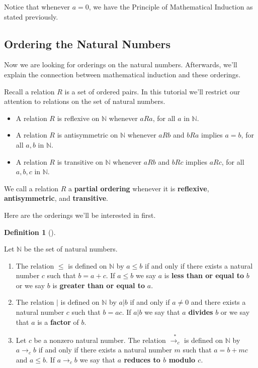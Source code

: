 \documentclass[
  twoside,
  12pt,
  letterpaper]{article}
\providecommand{\tightlist}{%
  \setlength{\itemsep}{0pt}\setlength{\parskip}{0pt}}\usepackage{longtable,booktabs,array}
\theoremstyle{definition}
\theoremstyle{definition}
\newtheorem{definition}{Definition}[section]
\theoremstyle{plain}
\theoremstyle{definition}
\theoremstyle{plain}
\theoremstyle{remark}
\begin{document}
Notice that whenever \(a=0\), we have the Principle of Mathematical
Induction as stated previously.

\hypertarget{ordering-the-natural-numbers}{%
\subsection{Ordering the Natural
Numbers}\label{ordering-the-natural-numbers}}

Now we are looking for orderings on the natural numbers. Afterwards,
we'll explain the connection between mathematical induction and these
orderings.

Recall a relation \(R\) is a set of ordered pairs. In this tutorial
we'll restrict our attention to relations on the set of natural numbers.

\begin{itemize}
\tightlist
\item
  A relation \(R\) is reflexive on \(\mathbb{N}\) whenever \(aRa\), for
  all \(a\) in \(\mathbb{N}\).
\item
  A relation \(R\) is antisymmetric on \(\mathbb{N}\) whenever \(aRb\)
  and \(bRa\) implies \(a=b\), for all \(a,b\) in \(\mathbb{N}\).
\item
  A relation \(R\) is transitive on \(\mathbb{N}\) whenever \(aRb\) and
  \(bRc\) implies \(aRc\), for all \(a,b,c\) in \(\mathbb{N}\).
\end{itemize}

We call a relation \(R\) a \textbf{partial ordering} whenever it is
\textbf{reflexive}, \textbf{antisymmetric}, and \textbf{transitive}.

Here are the orderings we'll be interested in first.

\begin{definition}[]\protect\hypertarget{def-less-than-divides}{}\label{def-less-than-divides}

Let \(\mathbb{N}\) be the set of natural numbers.

\begin{enumerate}
\def\labelenumi{\arabic{enumi}.}
\tightlist
\item
  The relation \(\leq\) is defined on \(\mathbb{N}\) by \(a\leq b\) if
  and only if there exists a natural number \(c\) such that \(b=a+c.\)
  If \(a\leq b\) we say \(a\) is \textbf{less than or equal to} \(b\) or
  we say \(b\) is \textbf{greater than or equal to} \(a.\)
\item
  The relation \(\vert\) is defined on \(\mathbb{N}\) by \(a|b\) if and
  only if \(a\neq 0\) and there exists a natural number \(c\) such that
  \(b=ac.\) If \(a\vert b\) we say that \(a\) \textbf{divides} \(b\) or
  we say that \(a\) is a \textbf{factor} of \(b.\)
\item
  Let \(c\) be a nonzero natural number. The relation
  \(\stackrel{*}{\rightarrow_c}\) is defined on \(\mathbb{N}\) by
  \(a\rightarrow_c b\) if and only if there exists a natural number
  \(m\) such that \(a=b+mc\) and \(a\leq b.\) If \(a\rightarrow_c b\) we
  say that \textbf{\(a\) reduces to \(b\) modulo \(c.\)}
\end{enumerate}

\end{definition}
\end{document}
